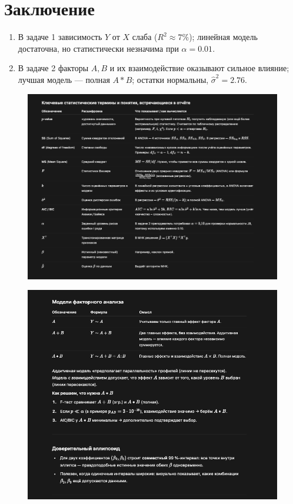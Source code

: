 \documentclass[12pt]{article}
\begin{document}
\section*{Заключение}

\begin{enumerate}
  \item В задаче 1 зависимость \(Y\) от \(X\) слаба (\(R^2\approx7\%\)); линейная модель достаточна, но статистически незначима при \(\alpha=0.01\).
  \item В задаче 2 факторы \(A,B\) и их взаимодействие оказывают сильное влияние; лучшая модель — полная \(A*B\); остатки нормальны, \(\hat\sigma^2=2.76\).
\end{enumerate}
\newpage
\begin{figure}[H]
    \centering
    \includegraphics[width=1\linewidth]{image.png}
\end{figure}
\newpage
\begin{figure}[H]
    \centering
    \includegraphics[width=1\linewidth]{image copy.png}
\end{figure}
\end{document}
